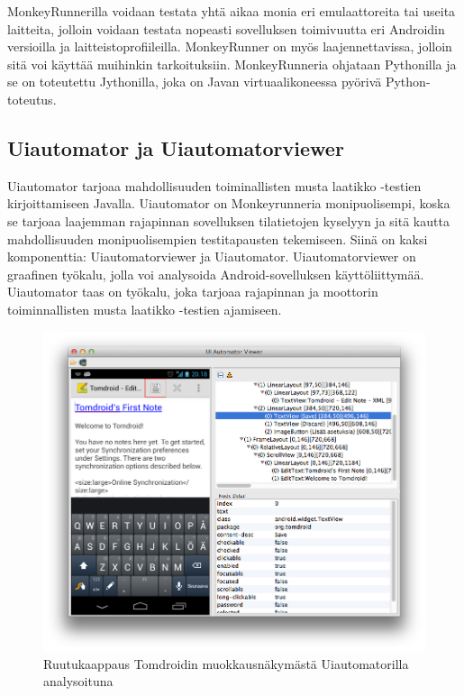 MonkeyRunnerilla voidaan testata yhtä aikaa monia eri emulaattoreita tai useita laitteita, jolloin voidaan testata nopeasti sovelluksen toimivuutta eri Androidin versioilla ja laitteistoprofiileilla. MonkeyRunner on myös laajennettavissa, jolloin sitä voi käyttää muihinkin tarkoituksiin. MonkeyRunneria ohjataan Pythonilla ja se on toteutettu Jythonilla, joka on Javan virtuaalikoneessa pyörivä Python-toteutus.

\subsection{Uiautomator ja Uiautomatorviewer}

Uiautomator \cite{uiautomator} tarjoaa mahdollisuuden toiminallisten musta laatikko -testien kirjoittamiseen Javalla. Uiautomator on Monkeyrunneria monipuolisempi, koska se tarjoaa laajemman rajapinnan sovelluksen tilatietojen kyselyyn ja sitä kautta mahdollisuuden monipuolisempien testitapausten tekemiseen. Siinä on kaksi komponenttia: Uiautomatorviewer ja Uiautomator. Uiautomatorviewer on graafinen työkalu, jolla voi analysoida Android-sovelluksen käyttöliittymää. Uiautomator taas on työkalu, joka tarjoaa rajapinnan ja moottorin toiminnallisten musta laatikko -testien ajamiseen.

\begin{figure}[h]
\centering
\includegraphics[width=160mm]{uiautomatorviewer.png}
\caption{Ruutukaappaus Tomdroidin muokkausnäkymästä Uiautomatorilla analysoituna} \label{uiautomatorviewer}
\end{figure}

